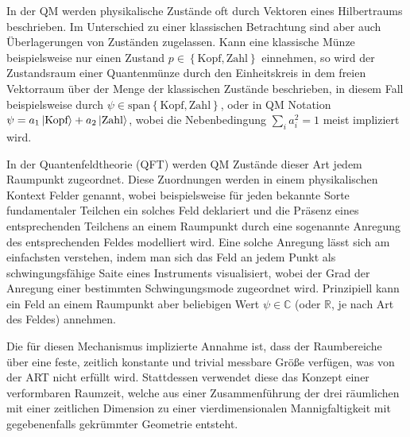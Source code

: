 In der QM werden physikalische Zustände oft durch Vektoren eines
Hilbertraums beschrieben. Im Unterschied zu einer klassischen
Betrachtung sind aber auch Überlagerungen von Zuständen
zugelassen. Kann eine klassische Münze beispielsweise nur einen
Zustand $p \in \left\lbrace \textrm{Kopf}, \textrm{Zahl}\right\rbrace$
einnehmen, so wird der Zustandsraum einer Quantenmünze durch den
Einheitskreis in dem freien Vektorraum über der Menge der klassischen
Zustände beschrieben, in diesem Fall beispielsweise durch $\psi \in
\textrm{span} \left\lbrace \textrm{Kopf}, \textrm{Zahl}\right\rbrace$,
oder in QM Notation $\psi = a_1 \left\vert \textrm{Kopf}\right> + a_2 \left\vert \textrm{Zahl}\right>$,
wobei die Nebenbedingung $\sum_i a^ 2_i = 1$ meist impliziert wird.

In der Quantenfeldtheorie (QFT) werden QM Zustände dieser Art jedem
Raumpunkt zugeordnet. Diese Zuordnungen werden in einem physikalischen
Kontext Felder genannt, wobei beispielsweise für jeden bekannte Sorte
fundamentaler Teilchen ein solches Feld deklariert und die Präsenz
eines entsprechenden Teilchens an einem Raumpunkt durch eine
sogenannte \glqq Anregung\grqq{} des entsprechenden Feldes modelliert
wird. Eine solche Anregung lässt sich am einfachsten verstehen, indem
man sich das Feld an jedem Punkt als schwingungsfähige Saite eines
Instruments visualisiert, wobei der Grad der Anregung einer bestimmten
Schwingungsmode zugeordnet wird. Prinzipiell kann ein Feld an einem
Raumpunkt aber beliebigen Wert $\psi\in\mathbb{C}$ (oder $\mathbb{R}$,
je nach Art des Feldes) annehmen.

Die für diesen Mechanismus implizierte Annahme ist, dass der
Raumbereiche über eine feste, zeitlich konstante und trivial messbare
Größe verfügen, was von der ART nicht erfüllt wird. Stattdessen
verwendet diese das Konzept einer verformbaren Raumzeit, welche aus
einer Zusammenführung der drei räumlichen mit einer zeitlichen
Dimension zu einer vierdimensionalen Mannigfaltigkeit mit
gegebenenfalls gekrümmter Geometrie entsteht.
